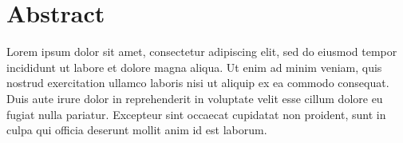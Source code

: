 \chapter*{Abstract}

Lorem ipsum dolor sit amet, consectetur adipiscing elit, sed do eiusmod tempor incididunt ut labore et dolore magna aliqua. Ut enim ad minim veniam, quis nostrud exercitation ullamco laboris nisi ut aliquip ex ea commodo consequat. Duis aute irure dolor in reprehenderit in voluptate velit esse cillum dolore eu fugiat nulla pariatur. Excepteur sint occaecat cupidatat non proident, sunt in culpa qui officia deserunt mollit anim id est laborum. 
